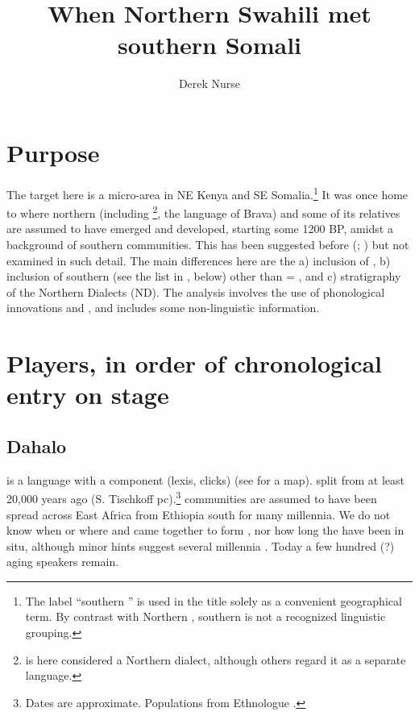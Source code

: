 \documentclass[output=paper
,newtxmath
,modfonts
,nonflat]{langsci/langscibook}
\title{When Northern Swahili met southern Somali}
\author{%
 Derek Nurse \affiliation{\ }
}
\begin{document}
\maketitle


\section{Purpose}\label{sec:nurse:1} 

The target here is a micro-area in NE Kenya and SE Somalia.\footnote{The label “southern ” is used in the title solely as a convenient geographical term. By contrast with Northern , southern  is not a recognized linguistic grouping.} It was once home to where northern  (including \footnote{ is here considered a Northern  dialect, although others regard it as a separate language.}, the language of Brava) and some of its relatives are assumed to have emerged and developed, starting some 1200 BP, amidst a background of southern  communities. This has been suggested before (\citealt{Nurse1983}; \citeyear{Nurse1985}) but not examined in such detail. The main differences here are the a) inclusion of , b) inclusion of southern  (see the list in , below) other than  = , and c) stratigraphy of the Northern  Dialects (ND). The analysis involves the use of phonological innovations and , and includes some non-linguistic information.

\section{Players, in order of chronological entry on stage}\label{sec:nurse:2}

\subsection{Dahalo}\label{sec:nurse:2.1} 

 is a  language with a  component (lexis, clicks) (see  for a map).  split from  at least 20,000 years ago (S. Tischkoff pc).\footnote{Dates are approximate. Populations from Ethnologue \citep{Lewis2015}.}   communities are assumed to have been spread across East Africa from Ethiopia south for many millennia. We do not know when or where  and  came together to form , nor how long the  have been in situ, although minor hints suggest several millennia \citep{Nurse1986}. Today a few hundred (?) aging  speakers remain. 
\end{document}
